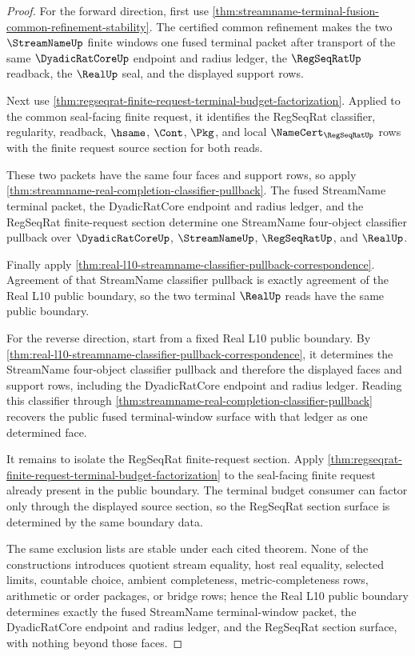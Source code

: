 \begin{proof}
For the forward direction, first use \autoref{thm:streamname-terminal-fusion-common-refinement-stability}. The certified common refinement makes the two $\StreamNameUp$ finite windows one fused terminal packet after transport of the same $\DyadicRatCoreUp$ endpoint and radius ledger, the $\RegSeqRatUp$ readback, the $\RealUp$ seal, and the displayed support rows.

Next use \autoref{thm:regseqrat-finite-request-terminal-budget-factorization}. Applied to the common seal-facing finite request, it identifies the RegSeqRat classifier, regularity, readback, $\hsame$, $\Cont$, $\Pkg$, and local $\NameCert_{\RegSeqRatUp}$ rows with the finite request source section for both reads.

These two packets have the same four faces and support rows, so apply \autoref{thm:streamname-real-completion-classifier-pullback}. The fused StreamName terminal packet, the DyadicRatCore endpoint and radius ledger, and the RegSeqRat finite-request section determine one StreamName four-object classifier pullback over $\DyadicRatCoreUp$, $\StreamNameUp$, $\RegSeqRatUp$, and $\RealUp$.

Finally apply \autoref{thm:real-l10-streamname-classifier-pullback-correspondence}. Agreement of that StreamName classifier pullback is exactly agreement of the Real L10 public boundary, so the two terminal $\RealUp$ reads have the same public boundary.

For the reverse direction, start from a fixed Real L10 public boundary. By \autoref{thm:real-l10-streamname-classifier-pullback-correspondence}, it determines the StreamName four-object classifier pullback and therefore the displayed faces and support rows, including the DyadicRatCore endpoint and radius ledger. Reading this classifier through \autoref{thm:streamname-real-completion-classifier-pullback} recovers the public fused terminal-window surface with that ledger as one determined face.

It remains to isolate the RegSeqRat finite-request section. Apply \autoref{thm:regseqrat-finite-request-terminal-budget-factorization} to the seal-facing finite request already present in the public boundary. The terminal budget consumer can factor only through the displayed source section, so the RegSeqRat section surface is determined by the same boundary data.

The same exclusion lists are stable under each cited theorem. None of the constructions introduces quotient stream equality, host real equality, selected limits, countable choice, ambient completeness, metric-completeness rows, arithmetic or order packages, or bridge rows; hence the Real L10 public boundary determines exactly the fused StreamName terminal-window packet, the DyadicRatCore endpoint and radius ledger, and the RegSeqRat section surface, with nothing beyond those faces.
\end{proof}

